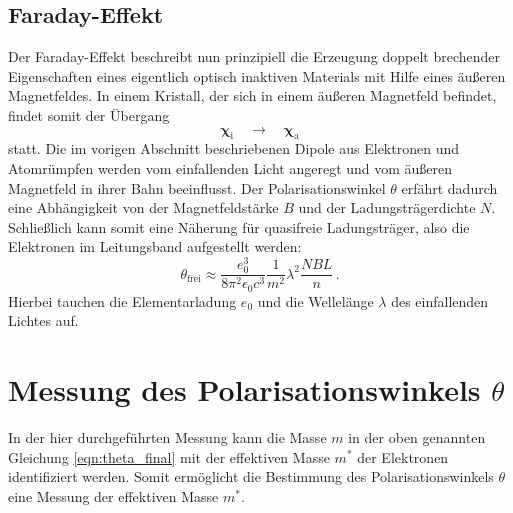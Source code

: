 \subsection{Faraday-Effekt} %
\label{sub:faraday_effekt}
Der Faraday-Effekt beschreibt nun prinzipiell die Erzeugung doppelt brechender
Eigenschaften eines eigentlich optisch inaktiven Materials mit Hilfe eines
äußeren Magnetfeldes.
In einem Kristall, der sich in einem äußeren Magnetfeld befindet,
findet somit der Übergang
\begin{equation}
\label{eq:inaktiv_to_aktiv}
    \mathbf{\chi}_\text{i} \quad \to \quad \mathbf{\chi}_\text{a}
\end{equation}
statt.
Die im vorigen Abschnitt beschriebenen Dipole aus Elektronen und Atomrümpfen
werden vom einfallenden Licht angeregt und vom äußeren Magnetfeld
in ihrer Bahn beeinflusst.
%
Der Polarisationswinkel $\theta$ erfährt dadurch eine Abhängigkeit
von der Magnetfeldstärke $B$ und der Ladungsträgerdichte $N$.
Schließlich kann somit eine Näherung für quasifreie Ladungsträger,
also die Elektronen im Leitungsband aufgestellt werden:
\begin{equation}
    \label{eqn:theta_final}
    \theta_\text{frei}
    \approx \frac{e_0^3}{8\pi^2\epsilon_0 c^3}
    \frac{1}{m^2}\lambda^2 \frac{NBL}{n}\,.
\end{equation}
Hierbei tauchen die Elementarladung $e_0$ und die Wellelänge $\lambda$ des
einfallenden Lichtes auf.

\clearpage
\section{Messung des Polarisationswinkels $\theta$} %
\label{sec:messung}
In der hier durchgeführten Messung kann die Masse $m$ in der oben genannten
Gleichung \eqref{eqn:theta_final} mit der effektiven Masse $m^*$ der
Elektronen identifiziert werden.
Somit ermöglicht die Bestimmung des Polarisationswinkels $\theta$ eine Messung
der effektiven Masse $m^*$.

